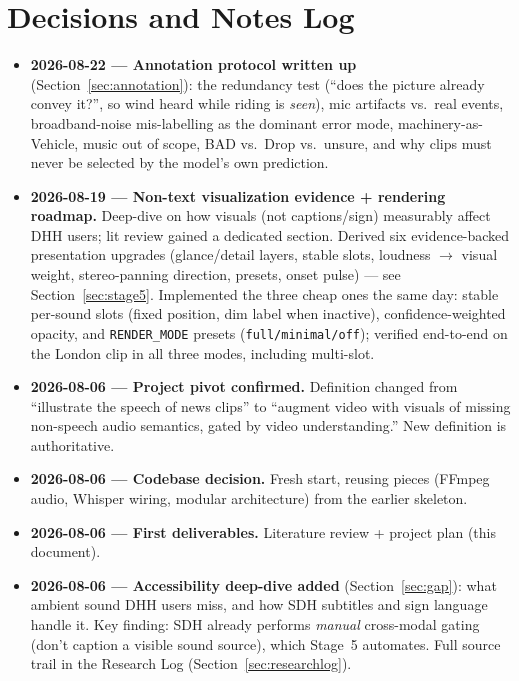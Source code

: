 \documentclass[11pt,a4paper]{article}
\begin{document}
\section{Decisions and Notes Log}\label{sec:changelog}
\begin{itemize}
  \item \textbf{2026-08-22 --- Annotation protocol written up} (Section~\ref{sec:annotation}): the redundancy test (``does the picture already convey it?'', so wind heard while riding is \emph{seen}), mic artifacts vs.\ real events, broadband-noise mis-labelling as the dominant error mode, machinery-as-Vehicle, music out of scope, BAD vs.\ Drop vs.\ unsure, and why clips must never be selected by the model's own prediction.
  \item \textbf{2026-08-19 --- Non-text visualization evidence + rendering roadmap.} Deep-dive on how
    visuals (not captions/sign) measurably affect DHH users; lit review gained a dedicated section.
    Derived six evidence-backed presentation upgrades (glance/detail layers, stable slots, loudness
    $\to$ visual weight, stereo-panning direction, presets, onset pulse) --- see
    Section~\ref{sec:stage5}. Implemented the three cheap ones the same day: stable per-sound
    slots (fixed position, dim label when inactive), confidence-weighted opacity, and
    \texttt{RENDER\_MODE} presets (\texttt{full/minimal/off}); verified end-to-end on the London
    clip in all three modes, including multi-slot.
  \item \textbf{2026-08-06 --- Project pivot confirmed.} Definition changed from ``illustrate the
    speech of news clips'' to ``augment video with visuals of missing non-speech audio semantics,
    gated by video understanding.'' New definition is authoritative.
  \item \textbf{2026-08-06 --- Codebase decision.} Fresh start, reusing pieces (FFmpeg audio,
    Whisper wiring, modular architecture) from the earlier skeleton.
  \item \textbf{2026-08-06 --- First deliverables.} Literature review + project plan (this document).
  \item \textbf{2026-08-06 --- Accessibility deep-dive added} (Section~\ref{sec:gap}): what ambient
    sound DHH users miss, and how SDH subtitles and sign language handle it. Key finding: SDH already
    performs \emph{manual} cross-modal gating (don't caption a visible sound source), which Stage~5
    automates. Full source trail in the Research Log (Section~\ref{sec:researchlog}).

\end{itemize}
\end{document}
